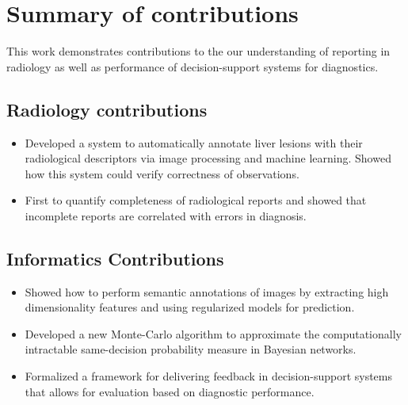 \section{Summary of contributions}
This work demonstrates contributions to the our understanding of reporting in radiology as well as performance of decision-support systems for diagnostics.

\subsection{Radiology contributions}

\begin{itemize}
	\item Developed a system to automatically annotate liver lesions with their radiological descriptors via image processing and machine learning. Showed how this system could verify correctness of observations.
	\item First to quantify completeness of radiological reports and showed that incomplete reports are correlated with errors in diagnosis.
\end{itemize}

\subsection{Informatics Contributions}

\begin{itemize}
	\item Showed how to perform semantic annotations of images by extracting high dimensionality features and using regularized models for prediction.
	\item Developed a new Monte-Carlo algorithm to approximate the computationally intractable same-decision probability measure in Bayesian networks.
	\item Formalized a framework for delivering feedback in decision-support systems that allows for evaluation based on diagnostic performance.
\end{itemize}


